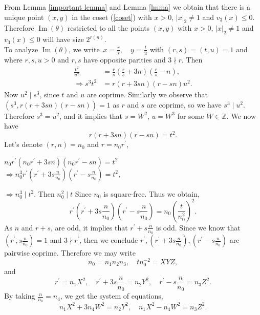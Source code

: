 \documentclass[11pt]{article}
\newcommand{\Z}{ {\mathbb{Z}} }
\newcommand{\im}{\operatorname{Im}}
\begin{document}
\noindent From Lemma \ref{important lemma} and Lemma \ref{lmma} we obtain that there is a unique point $(x,y)$ in the coset (\ref{coset}) with $x>0$, $|x|_{2}\neq 1$ and $v_{3}(x)\leq 0$. Therefore $\im(\theta)$ restricted to all the points $(x,y)$ with $x>0$, $|x|_{2}\neq 1$ and $v_{3}(x)\leq 0$ will have size $2^{r(n)}$.\\

\noindent To analyze $\im(\theta)$, we write $\, x=\frac{r}{s},\quad y=\frac{t}{u}$ with $(r,s)=(t,u)=1$ and where $r,s,u >0$ and $r,s$ have opposite parities and $3\nmid r$. Then
\begin{align*}
\frac{t^{2}}{u^{2}}  & =\frac{r}{s}(\frac{r}{s}+3n)(\frac{r}{s}-n), \\ 
\Rightarrow s^{3}t^{2} &  =r(r+3sn)(r-sn)u^{2}.
\end{align*}
Now $u^{2}\mid s^{3}$, since $t$ and $u$ are coprime. Similarly we observe that $(s^{3}, r(r+3sn)(r-sn))=1$ as $r$ and $s$ are coprime, so we have $s^{3}\mid u^{2}$. Therefore $s^{3}=u^{2}$, and it implies that $s=W^{2}$, $u=W^{3}$ for some $W \in \Z$. We now have
$$r(r+3sn)(r-sn)=t^{2}.$$ 
Let's denote $(r,n)=n_{0}$ and $r=n_{0}r^{\prime}$, 
\begin{center}
$n_{0}r^{\prime}(n_{0}r^{\prime}+3sn)(n_{0}r^{\prime}-sn)=t^{2}$\\
\vspace*{0.3cm}
$\Rightarrow n_{0}^{3}r^{\prime}(r^{\prime}+3s\frac{n}{n_{0}})(r^{\prime}-s\frac{n}{n_{0}})=t^{2}$,
\end{center}
$\Rightarrow n_{0}^{3}\mid t^{2}$. Then $n_{0}^{2}\mid t$ Since $n_{0}$ is square-free. Thus we obtain, 
\begin{equation}\label{eq:1}
r^{\prime}(r^{\prime}+3s\frac{n}{n_{0}})(r^{\prime}-s\frac{n}{n_{0}})=n_{0}\left( \frac{t}{n_{0}^{2}} \right)^{2}.
\end{equation}
As $n$ and $r+s$, are odd, it implies that  $r^{\prime}+s\frac{n}{n_{0}}$ is odd. Since we know that $(r^{\prime},s\frac{n}{n_{0}})=1$ and $3\nmid r^{\prime}$, then we conclude $r^{\prime}, (r^{\prime}+3s\frac{n}{n_{0}}), (r^{\prime}-s\frac{n}{n_{0}})$ are pairwise coprime. Therefore we may write
$$n_{0}=n_{1}n_{2}n_{3},\quad tn_{0}^{-2}=XYZ,$$
and
$$r^{\prime}=n_{1}X^{2},\quad r^{\prime}+3s\frac{n}{n_{0}}=n_{2}Y^{2},\quad r^{\prime}-s\frac{n}{n_{0}}=n_{3}Z^{2}.$$
\noindent By taking $\frac{n}{n_{0}}=n_{4}$, we get the system of equations,
\begin{equation}\label{eq:2}
n_{1}X^{2}+3n_{4}W^{2}=n_{2}Y^{2},\quad n_{1}X^{2}-n_{4}W^{2}=n_{3}Z^{2}.
\end{equation}
\end{document}
